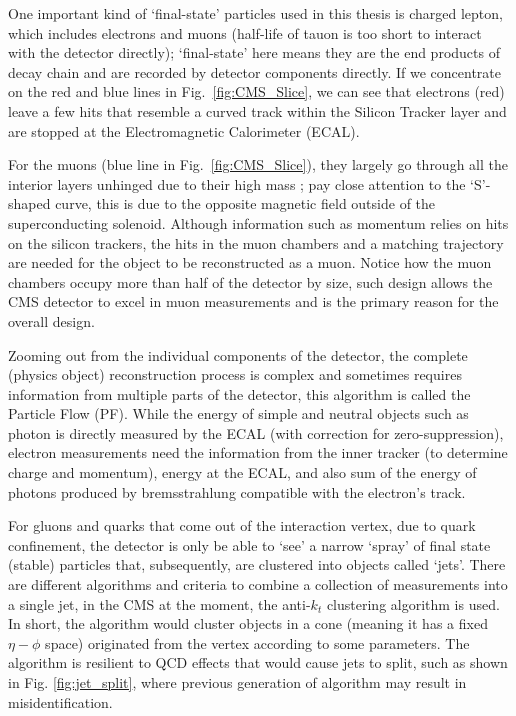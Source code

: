 One important kind of `final-state' particles used in this thesis is charged lepton, 
which includes electrons and muons (half-life of tauon is too short to interact with
the detector directly);
`final-state' here means they are the end products of decay chain and are recorded by detector
components directly. If we concentrate on the red and blue lines in Fig.~\ref{fig:CMS_Slice}, we
can see that  electrons (red) leave a few hits that resemble a curved
track within the Silicon Tracker layer and are stopped at the Electromagnetic Calorimeter
(ECAL). 

For the muons (blue line in Fig.~\ref{fig:CMS_Slice}), they largely go through all the interior layers unhinged 
due to their high mass ;
pay close attention to the `S'-shaped curve, this is due to the opposite magnetic
field outside of the superconducting solenoid. Although information such as momentum relies on
hits on the silicon trackers, the hits in the muon chambers and a matching trajectory are needed 
for the object to be reconstructed as a muon. Notice how the
muon chambers occupy more than half of the detector by size, such design allows the CMS 
detector to excel in muon measurements and is the primary reason for the overall design.

Zooming out from the individual components of the detector, the complete (physics object) reconstruction
process is complex and sometimes requires information from multiple parts of the detector, this
algorithm is called the Particle Flow (PF)\cite{particle_flow}. While the energy of simple and neutral 
objects such as photon is directly measured by the ECAL (with correction for zero-suppression), electron measurements
need the information from the inner tracker (to determine charge and momentum), energy at the ECAL, and
also sum of the energy of photons produced by bremsstrahlung compatible with the electron's track.

For gluons and quarks that come out of the interaction vertex, due to quark confinement, the detector 
is only be able to `see' a narrow `spray' of final state (stable) particles that, subsequently, 
are clustered into objects called `jets'.
There are different algorithms and criteria to combine a collection of measurements into a single jet,
in the CMS at the moment, the anti-$k_t$ clustering algorithm is used. In short, the algorithm would cluster objects
in a cone (meaning it has a fixed $\eta-\phi$ space) originated from the vertex according to some parameters.
The algorithm is resilient to QCD effects that would cause jets to split, such as shown in Fig.
\ref{fig:jet_split}, where previous generation of algorithm may result in misidentification.

